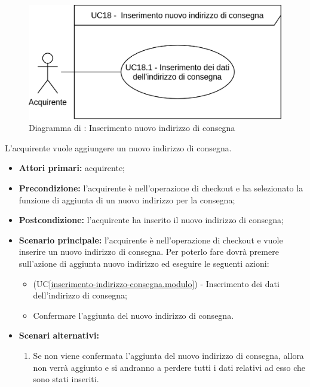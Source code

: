 
\label{inserimento-indirizzo-consegna}

\begin{figure}[H]
    \centering
    \includegraphics[scale=1]{Immagini/DiagrammiUC/Acquirente/InserimentoIndirizzoConsegna.png}
    \caption{Diagramma di \actualUC: Inserimento nuovo indirizzo di consegna} 
    \label{fig:inserimento-indirizzo-consegna}
\end{figure}

L'acquirente vuole aggiungere un nuovo indirizzo di consegna.
\begin{itemize}
    \item \textbf{Attori primari:} acquirente;
    \item \textbf{Precondizione:} l'acquirente è nell'operazione di checkout e ha selezionato la funzione di aggiunta di un nuovo indirizzo per la consegna;
    \item \textbf{Postcondizione:} l'acquirente ha inserito il nuovo indirizzo di consegna;
    \item \textbf{Scenario principale:} l'acquirente è nell'operazione di checkout e vuole inserire un nuovo indirizzo di consegna. Per poterlo fare dovrà premere sull'azione di aggiunta nuovo indirizzo ed eseguire le seguenti azioni:
    \begin{itemize}
        \item (UC\ref{inserimento-indirizzo-consegna.modulo}) - Inserimento dei dati dell'indirizzo di consegna; 
        \item Confermare l'aggiunta del nuovo indirizzo di consegna.
    \end{itemize}
    \item \textbf{Scenari alternativi:}
    \begin{enumerate}[label=\lett]
        \item Se non viene confermata l'aggiunta del nuovo indirizzo di consegna, allora non verrà aggiunto e si andranno a perdere tutti i dati relativi ad esso che sono stati inseriti.
    \end{enumerate}
\end{itemize}

